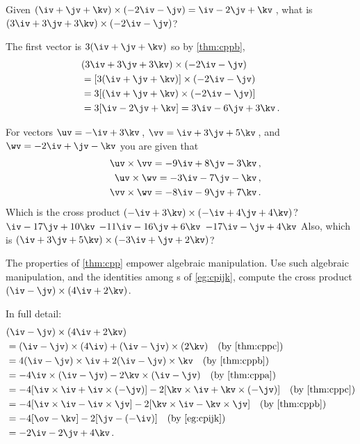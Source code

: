 \begin{example} 
Given \((\iv+\jv+\kv)\times(-2\iv-\jv)=\iv-2\jv+\kv\)\,, what is \((3\iv+3\jv+3\kv)\times(-2\iv-\jv)\)?
\begin{solution} 
The first vector is \(3(\iv+\jv+\kv)\) so by \cref{thm:cppb},
\begin{align*}
&(3\iv+3\jv+3\kv)\times(-2\iv-\jv)
\\&=[3(\iv+\jv+\kv)]\times(-2\iv-\jv)
\\&=3[(\iv+\jv+\kv)\times(-2\iv-\jv)]
\\&=3[\iv-2\jv+\kv]=3\iv-6\jv+3\kv\,.
\end{align*}
\end{solution}
\end{example}



\begin{activity}  
For vectors \(\uv=-\iv+3\kv\)\,, \(\vv=\iv+3\jv+5\kv\)\,, and \(\wv=-2\iv+\jv-\kv\) you are given that 
\begin{eqnarray*}
&&\uv\times\vv=-9\iv+8\jv-3\kv\,,
\\&&\uv\times\wv=-3\iv-7\jv-\kv\,,
\\&&\vv\times\wv=-8\iv-9\jv+7\kv\,.
\end{eqnarray*}
Which is the cross product \((-\iv+3\kv)\times(-\iv+4\jv+4\kv)\)?
\actposs{\(-12\iv+\jv-4\kv\)}
{\(\iv-17\jv+10\kv\)}
{\(-11\iv-16\jv+6\kv\)}
{\(-17\iv-\jv+4\kv\)}
Also, which is \((\iv+3\jv+5\kv)\times(-3\iv+\jv+2\kv)\)? %
\end{activity}



\begin{reduce}
\begin{example} 
The properties of \cref{thm:cpp} empower algebraic manipulation.
Use such algebraic manipulation, and the identities among s of \cref{eg:cpijk}, compute the cross product \((\iv-\jv)\times(4\iv+2\kv)\).
\begin{solution} In full detail:
\begin{align*}
&(\iv-\jv)\times(4\iv+2\kv)
\\&=(\iv-\jv)\times(4\iv)+(\iv-\jv)\times(2\kv) 
\quad(\text{by \ref{thm:cppc}})
\\&=4(\iv-\jv)\times\iv+2(\iv-\jv)\times\kv
\quad(\text{by \ref{thm:cppb}})
\\&=-4\iv\times(\iv-\jv)-2\kv\times(\iv-\jv)
\quad(\text{by \ref{thm:cppa}})
\\&=-4[\iv\times\iv+\iv\times(-\jv)]-2[\kv\times\iv+\kv\times(-\jv)]
\quad(\text{by \ref{thm:cppc}})
\\&=-4[\iv\times\iv-\iv\times\jv]-2[\kv\times\iv-\kv\times\jv]
\quad(\text{by \ref{thm:cppb}})
\\&=-4[\ov-\kv]-2[\jv-(-\iv)]
\quad(\text{by \cref{eg:cpijk}})
\\&=-2\iv-2\jv+4\kv\,.
\end{align*}
\end{solution}
\end{example}
\end{reduce}







